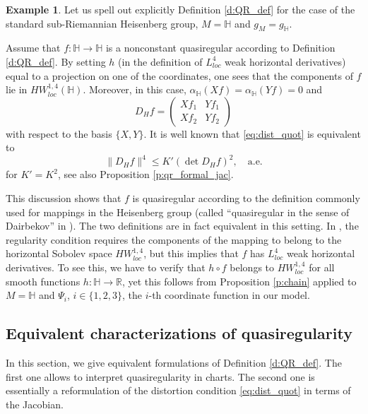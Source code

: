 \documentclass[10pt,letterpaper]{amsart}
\theoremstyle{definition}
\newtheorem{example}[thm]{Example}
\numberwithin{thm}{subsection}
\numberwithin{equation}{section}
\begin{document}
\begin{example} Let us spell out explicitly Definition
\ref{d:QR_def} for the case of the standard sub-Riemannian Heisenberg group,
$M={\mathbb H}$ and $g_M= g_{\mathbb H}$.

Assume that $f:{\mathbb H}\to {\mathbb H}$ is a  nonconstant quasiregular
according to Definition \ref{d:QR_def}. By setting $h$ (in the
definition of $L^4_{loc}$ weak horizontal derivatives) equal to a
projection on one of the coordinates, one sees that the components
of $f$ lie in $HW_{loc}^{1,4}({\mathbb H})$. Moreover, in this case,
$\alpha_{\mathbb H}(Xf)=\alpha_{\mathbb H}(Yf)=0$ and
\begin{displaymath}
D_H f= \begin{pmatrix} Xf_1 & Yf_1\\ Xf_2 & Yf_2\end{pmatrix}
\end{displaymath}
with respect to the basis $\{X,Y\}$.
It is well known that \eqref{eq:dist_quot} is equivalent to
\begin{displaymath}
 \|D_H f\|^4 \leq K' (\det D_H f)^2,\quad\text{a.e.}
\end{displaymath}
 for $K'=K^2$, see also Proposition \ref{p:qr_formal_jac}.

 This discussion shows that $f$ is quasiregular according to the definition commonly used for mappings in the Heisenberg group
 \cite{Da} (called ``quasiregular in the sense of Dairbekov'' in \cite{GL}).
The two definitions are in fact equivalent in this setting. In \cite{Da}, the regularity condition requires the components of the mapping to belong to the horizontal Sobolev space $HW_{loc}^{1,4}$, but this implies that $f$ has $L^4_{loc}$ weak horizontal derivatives.
 To see this, we have to verify that $h\circ f$ belongs to $HW_{loc}^{1,4}$ for all smooth functions $h:{\mathbb H} \to \mathbb{R}$, yet this follows from Proposition \ref{p:chain} applied to $M= {\mathbb H}$ and $\Psi_i$, $i\in \{1,2,3\}$, the $i$-th coordinate function in our model.
\end{example}

\subsection{Equivalent characterizations of
quasiregularity}\label{ss:equiv_char}

In this section, we give equivalent formulations of Definition
\ref{d:QR_def}. The first one allows
to interpret quasiregularity in charts. The second one is
essentially a reformulation of the distortion condition
\eqref{eq:dist_quot} in terms of the Jacobian.
\end{document}
